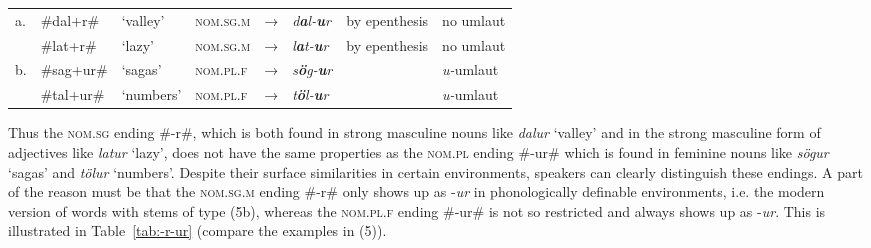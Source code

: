 \documentclass[output=paper,
modfonts
]{LSP/langsci}
\begin{document}
\ea\begin{tabular}[t]{ll@{ }l@{ }l@{ \ }l@{ \ }l@{ }l@{ \ }l@{}}
a. & \#dal+r\# & `valley' & \textsc{nom.sg.m} & → & \emph{d\textbf{a}l-\textbf{u}r} & by epenthesis & no umlaut\\
&\#lat+r\# &`lazy' &\textsc{nom.sg.m} &→& \emph{l\textbf{a}t-\textbf{u}r} &by epenthesis &no umlaut\\
b. &\#sag+ur\#& `sagas' &\textsc{nom.pl.f}& →& \emph{s\textbf{ö}g-\textbf{u}r}& &\emph{u-}umlaut\\
&\#tal+ur\# &`numbers' &\textsc{nom.pl.f}& →& \emph{t\textbf{ö}l-\textbf{u}r}&& \emph{u-}umlaut\\
\end{tabular}
\z

\noindent Thus the \textsc{nom.sg} ending \#-r\#, which is both found in strong
masculine nouns like \emph{dalur} `valley' and in the strong masculine
form of adjectives like \emph{latur} `lazy', does not have the same
properties as the \textsc{nom.pl} ending \#-ur\# which is found in
feminine nouns like \emph{sögur} `sagas' and \emph{tölur} `numbers'.
Despite their surface similarities in certain environments, speakers can
clearly distinguish these endings. A part of the reason must be that the
\textsc{nom.sg.m} ending \#-r\# only shows up as -\emph{ur} in
phonologically definable environments, i.e. the modern version of words
with stems of type (5b), whereas the \textsc{nom.pl.f} ending \#-ur\# is
not so restricted and always shows up as -\emph{ur}. This is illustrated
in Table~\ref{tab:-r-ur} (compare the examples in (5)).
\end{document}
